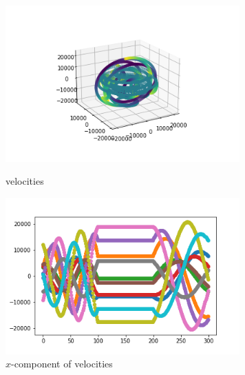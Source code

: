 \documentclass[12pt]{article}
\begin{document}
	\begin{figure}[H]
		\begin{multicols}{2}
			\includegraphics[width=\linewidth, height=6cm]{multivs2.png} \caption{velocities} \label{multivs2} \par
			\includegraphics[width=\linewidth, height=6cm]{multivsx2.png} \caption{$x$-component of velocities} \label{multivsx2} \par
		\end{multicols}
	\end{figure}
\end{document}
